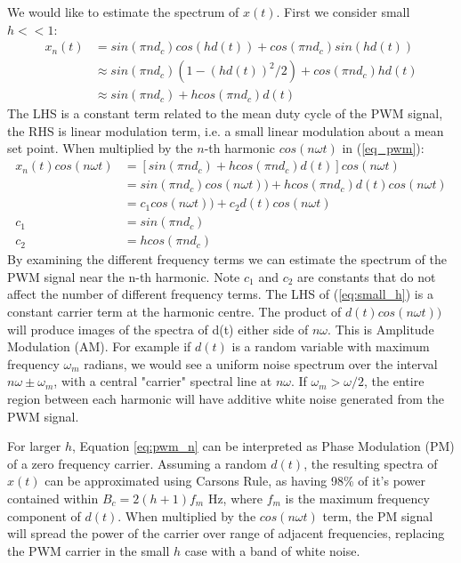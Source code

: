 \documentclass{article}
\begin{document}
We would like to estimate the spectrum of $x(t)$. First we consider small $h << 1$:
\begin{equation} \label{eq:small_h}
\begin{split}
x_n(t) &= sin(\pi n d_c)cos(hd(t)) + cos(\pi n d_c)sin(hd(t)) \\
       &\approx sin(\pi n d_c)(1 - (hd(t))^2/2) + cos(\pi n d_c)hd(t) \\
       &\approx sin(\pi n d_c) + hcos(\pi n d_c)d(t)
\end{split}
\end{equation}
The LHS is a constant term related to the mean duty cycle of the PWM signal, the RHS is linear modulation term, i.e. a small linear modulation about a mean set point.  When multiplied by the $n$-th harmonic $cos(n \omega t)$ in (\ref{eq_pwm}):
\begin{equation} \label{eq:small_h}
\begin{split}
x_n(t)cos(n \omega t) &= \left[ sin(\pi n d_c) + hcos(\pi n d_c)d(t) \right] cos(n \omega t) \\
                      &= sin(\pi n d_c)cos(n \omega t)) + hcos(\pi n d_c)d(t)cos(n \omega t) \\
                      &= c_1 cos(n \omega t)) + c_2 d(t)cos(n \omega t) \\
                   c_1 &= sin(\pi n d_c) \\
                   c_2 &= hcos(\pi n d_c)
\end{split}
\end{equation}
By examining the different frequency terms we can estimate the spectrum of the PWM signal near the n-th harmonic. Note $c_1$ and $c_2$ are constants that do not affect the number of different frequency terms. The LHS of (\ref{eq:small_h}) is a constant carrier term at the harmonic centre. The product of $d(t)cos(n \omega t))$ will produce images of the spectra of d(t) either side of $n \omega$. This is Amplitude Modulation (AM).  For example if $d(t)$ is a random variable with maximum frequency $\omega_m$ radians, we would see a uniform noise spectrum over the interval $n \omega \pm \omega_m$, with a central "carrier" spectral line at $n \omega$. If $\omega_m > \omega/2$, the entire region between each harmonic will have additive white noise generated from the PWM signal.

For larger $h$, Equation \ref{eq:pwm_n} can be interpreted as Phase Modulation (PM) \cite{wikipedia_phase} of a zero frequency carrier. Assuming a random $d(t)$, the resulting spectra of $x(t)$ can be approximated using Carsons Rule, as having 98\% of it's power contained within $B_c=2(h+1)f_m$ Hz, where $f_m$ is the maximum frequency component of $d(t)$. When multiplied by the $cos(n \omega t)$ term, the PM signal will spread the power of the carrier over range of adjacent frequencies, replacing the PWM carrier in the small $h$ case with a band of white noise.
\end{document}
